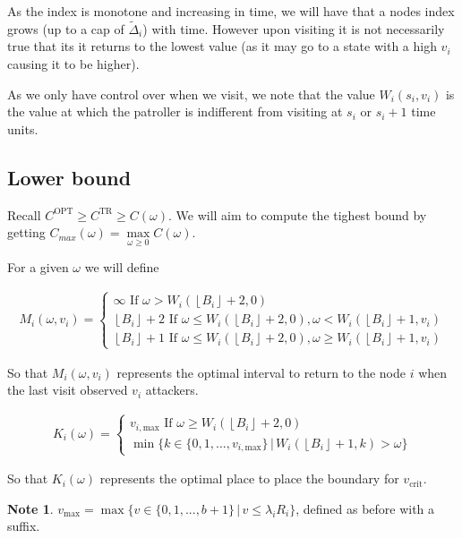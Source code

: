 \documentclass[a4paper,10pt]{article}
\newcommand{\floor}[1]{\left \lfloor #1 \right \rfloor}
\theoremstyle{definition}
\theoremstyle{definition}
\theoremstyle{remark}
\theoremstyle{definition}
\newtheorem*{note}{Note}
\begin{document}
As the index is monotone and increasing in time, we will have that a nodes index grows (up to a cap of $\widetilde{\Delta}_{i}$) with time. However upon visiting it is not necessarily true that its it returns to the lowest value (as it may go to a state with a high $v_{i}$ causing it to be higher).

As we only have control over when we visit, we note that the value $W_{i}(s_{i},v_{i})$ is the value at which the patroller is indifferent from visiting at $s_{i}$ or $s_{i}+1$ time units.

\subsection{Lower bound}
Recall $C^{\text{OPT}} \geq C^{\text{TR}} \geq C(\omega)$. We will aim to compute the tighest bound by getting $C_{max}(\omega)=\max\limits_{\omega \geq 0}C(\omega)$.

For a given $\omega$ we will define

\begin{align}
M_{i}(\omega,v_{i})= \begin{cases}
\infty \text{ If } \omega > W_{i}(\floor{B_{i}}+2,0) \\
\floor{B_{i}}+2 \text{ If } \omega \leq W_{i}(\floor{B_{i}}+2,0) , \omega < W_{i}(\floor{B_{i}}+1,v_{i}) \\
\floor{B_{i}}+1 \text{ If } \omega \leq W_{i}(\floor{B_{i}}+2,0) , \omega \geq W_{i}(\floor{B_{i}}+1,v_{i})
\end{cases}
\end{align}

So that $M_{i}(\omega,v_{i})$ represents the optimal interval to return to the node $i$ when the last visit observed $v_{i}$ attackers.

\begin{align}
K_{i}(\omega)= \begin{cases}
v_{i,\text{max}} \text{ If } \omega \geq W_{i}(\floor{B_{i}}+2,0) \\
\min \{ k \in \{ 0,1,...,v_{i,\text{max}} \} \, | \, W_{i}(\floor{B_{i}}+1,k) > \omega \}  
\end{cases}
\end{align}

So that $K_{i}(\omega)$ represents the optimal place to place the boundary for $v_{\text{crit}}$.

\begin{note}
$v_{\text{max}}= \max \{ v \in \{0,1,...,b+1 \} \, | \, v \leq \lambda_{i} R_{i} \}$, defined as before with a suffix.
\end{note}
\end{document}
